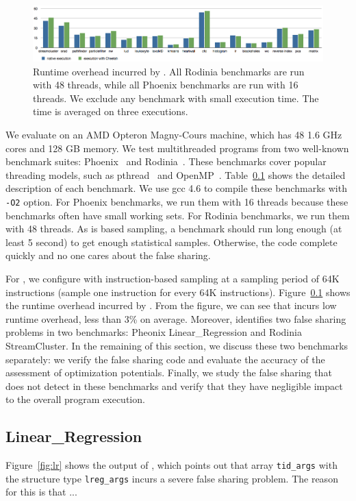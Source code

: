 \label{sec:eval}

\begin{figure}[htbp]
\centering
\label{fig:overhead}
\includegraphics[width=2\columnwidth]{figure/overhead}
\caption{Runtime overhead incurred by \Cheetah{}. All Rodinia benchmarks are run with 48 threads, while all Phoenix benchmarks are run with 16 threads. We exclude any benchmark with small execution time. The time is averaged on three executions.}
\end{figure}

We evaluate \cheetah{} on an AMD Opteron Magny-Cours machine, which has 48 1.6 GHz cores and 128 GB memory. We test multithreaded programs from two well-known benchmark suites: Phoenix~\cite{} and Rodinia~\cite{}. These benchmarks cover popular threading models, such as pthread~\cite{} and OpenMP~\cite{}. Table~\ref{} shows the detailed description of each benchmark. We use gcc 4.6 to compile these benchmarks with {\tt -O2} option. For Phoenix benchmarks, we run them with 16 threads because these benchmarks often have small working sets. For Rodinia benchmarks, we run them with 48 threads. As \cheetah is based sampling, a benchmark should run long enough (at least 5 second) to get enough statistical samples. Otherwise, the code complete quickly and no one cares about the false sharing. 

For \cheetah{}, we configure with instruction-based sampling at a sampling period of 64K instructions (sample one instruction for every 64K instructions). Figure~\ref{} shows the runtime overhead incurred by \cheetah{}. From the figure, we can see that \cheetah{} incurs low runtime overhead, less than 3\% on average. Moreover, \cheetah{} identifies two false sharing problems in two benchmarks: Pheonix Linear\_Regression and Rodinia StreamCluster. In the remaining of this section, we discuss these two benchmarks separately: we verify the false sharing code and evaluate the accuracy of the assessment of optimization potentials. Finally, we study the false sharing that \cheetah{} does not detect in these benchmarks and verify that they have negligible impact to the overall program execution. 

\subsection{Linear\_Regression}
Figure~\ref{fig:lr} shows the output of \cheetah{}, which points out that array {\tt tid\_args} with the structure type {\tt lreg\_args} incurs a severe false sharing problem. The reason for this is that ...

